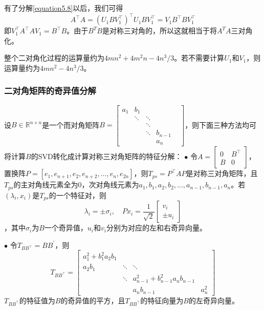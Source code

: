 \documentclass[notheorems,serif]{beamer}
\begin{document}
\begin{frame}
有了分解\ref{equation5.8}以后，我们可得$$
A^{\top} A=\left(U_{1} B V_{1}^{\top}\right)^{\top} U_{1} B V_{1}^{\top}=V_{1} B^{\top} B V_{1}^{\top}
$$即$V_{1}^{\top} A^{\top} A V_{1}=B^{\top} B$。由于$B^TB$是对称三对角的，所以这就相当于将$A^TA$三对角化。

整个二对角化过程的运算量约为$4mn^2+4m^2n-4n^3/3$。若不需要计算$U_1$和$V_1$，则运算量约为$4mn^2-4n^3/3$。\\
\end{frame}
\begin{frame}
\frametitle{二对角矩阵的奇异值分解}


设$B \in \mathbb{R}^{n \times n}$是一个而对角矩阵$B=\left[\begin{array}{cccccc}{a_{1}} & {b_{1}} & {} & {} & {} \\ {} & {\ddots} & {\ddots} & {} \\ {} & {} & {\ddots} & {} & {} \\ {} & {} & {\ddots} & {b_{n-1}} \\ {} & {} & {} & {a_{n}}\end{array}\right]$，则下面三种方法均可将计算$B$的SVD转化成计算对称三对角矩阵的特征分解：
$\bullet$ 令$A=\left[\begin{array}{ll}{0} & {B^{\top}} \\ {B} & {0}\end{array}\right]$，置换阵$P=\left[e_{1}, e_{n+1}, e_{2}, e_{n+2}, \ldots, e_{n}, e_{2 n}\right]$，则$T_{p s}=P^{\top} A P$是对称三对角矩阵，且$T_{p s}$的主对角线元素全为0，次对角线元素为$a_{1}, b_{1}, a_{2}, b_{2}, \dots, a_{n-1}, b_{n-1}, a_{n}$。若$\left(\lambda_{i}, x_{i}\right)$是$T_{p s}$的一个特征对，则$$
	\lambda_{i}=\pm \sigma_{i}, \quad P x_{i}=\frac{1}{\sqrt{2}}\left[\begin{array}{c}{v_{i}} \\ { \pm u_{i}}\end{array}\right]
	$$，其中$\sigma_{i}$为$B$一个奇异值，$u_i$和$v_i$分别为对应的左和右奇异向量。
\end{frame}
\begin{frame}
$\bullet$ 令$T_{B B^{\top}}=B B^{\prime}$，则$$
	T_{B B^{\top}}=\left[\begin{array}{cccc}{a_{1}^{2}+b_{1}^{2} a_{2} b_{1}} & {} & {} \\ {a_{2} b_{1}} & {\ddots} & {\ddots} & {} \\ {} & {\ddots} & {a_{n-1}^{2}+b_{n-1}^{2} a_{n} b_{n-1}} \\ {} & {} & {a_{n} b_{n-1}} & {a_{n}^{2}}\end{array}\right]
	$$
	$T_{B B^{\top}}$的特征值为$B$的奇异值的平方，且$T_{B B^{\top}}$的特征向量为$B$的左奇异向量。
\end{frame}
\end{document}
